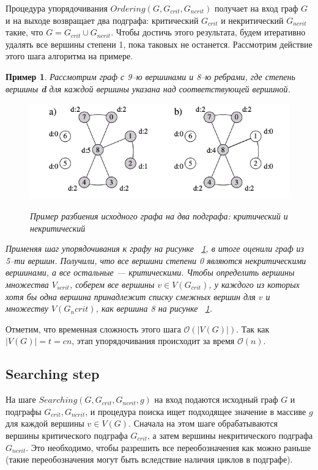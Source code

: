 \documentclass[specialist,
               substylefile = spbu.rtx,
               subf,href,colorlinks=true, 12pt]{disser}
\newtheorem{myexample}{Пример}
\begin{document}
Процедура упорядочивания $Ordering (G, G_{crit}, G_{ncrit})$ получает на вход граф $G$ и на выходе возвращает два подграфа: критический $G_{crit}$ и некритический $G_{ncrit}$ такие, что $G = G_{crit} \cup G_{ncrit}$. Чтобы достичь этого результата, будем итеративно удалять все вершины степени 1, пока таковых не останется. Рассмотрим действие этого шага алгоритма на примере.

\begin{myexample}
Рассмотрим граф с 9--ю вершинами и 8--ю ребрами, где степень вершины \textbf{d} для каждой вершины указана над соответствующей вершиной.

\begin{figure}[h]
\begin{center}
\includegraphics[scale=0.5]{imgs/ex2.jpg}\label{im:ex2}
\caption{Пример разбиения исходного графа на два подграфа: критический и некритический}
\end{center}
\end{figure}

Применяя шаг упорядочивания к графу на рисунке ~\ref{im:ex2}, в итоге оценили граф из 5--ти вершин. Получили, что все вершини степени 0 являются некритическими вершинами, а все остальные --- критическими. Чтобы определить вершины множества $V_{scrit}$, соберем все вершины $v \in V(G_{crit})$, у каждого из которых хотя бы одна вершина принадлежит списку смежных вершин для $v$ и множеству $V(G_ncrit)$, как вершина 8 на рисунке ~\ref{im:ex2}.
\end{myexample}

Отметим, что временная сложность этого шага $\mathcal{O}(|V(G)|)$. Так как $|V(G)| = t = cn$, этап упорядочивания происходит за время $\mathcal{O}(n)$.

\newpage

\subsection{Searching step}

На шаге $Searching (G, G_{crit}, G_{ncrit}, g)$ на вход подаются исходный граф $G$ и подграфы $G_{crit}, G_{ncrit}$, и процедура поиска ищет подходящее значение в массиве $g$ для каждой вершины $v \in V(G)$. Сначала на этом шаге обрабатываются вершины критического подграфа $G_{crit}$, а затем вершины некритического подграфа $G_{ncrit}$. Это необходимо, чтобы разрешить все переобозначения как можно раньше (такие переобозначения могут быть вследствие наличия циклов в подграфе).
\end{document}
